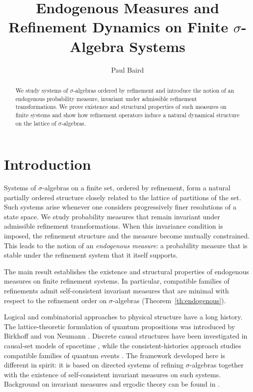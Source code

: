 \documentclass[
 amsmath,amssymb,
  onecolumn %
]{revtex4-2}
\begin{document}
\title{Endogenous Measures and Refinement Dynamics on Finite $\sigma$-Algebra Systems}


\author{Paul Baird}

\begin{abstract}
We study systems of $\sigma$-algebras ordered by refinement and introduce the
notion of an endogenous probability measure, invariant under admissible
refinement transformations. We prove existence and structural properties
of such measures on finite systems and show how refinement
operators induce a natural dynamical structure on the lattice of
$\sigma$-algebras.
\end{abstract}



\maketitle


\section{Introduction}\label{sec1}

Systems of $\sigma$-algebras on a finite set, ordered by refinement,
form a natural partially ordered structure closely related to the
lattice of partitions of the set. Such systems arise whenever one
considers progressively finer resolutions of a state space.
We study probability measures that remain invariant under admissible
refinement transformations. When this invariance condition is imposed,
the refinement structure and the measure become mutually constrained.
This leads to the notion of an \emph{endogenous measure}: a probability
measure that is stable under the refinement system that it itself
supports.

The main result establishes the existence and structural properties
of endogenous measures on finite refinement systems. In particular,
compatible families of refinements admit self-consistent invariant
measures that are minimal with respect to the refinement order on
$\sigma$-algebras (Theorem~\ref{th:endogenous}).

Logical and combinatorial approaches to physical structure have a long
history. The lattice-theoretic formulation of quantum propositions was
introduced by Birkhoff and von Neumann \cite{BvN}. Discrete causal
structures have been investigated in causal-set models of spacetime
\cite{BLS}, while the consistent-histories approach studies compatible
families of quantum events \cite{Gr}. The framework developed here is
different in spirit: it is based on directed systems of refining
$\sigma$-algebras together with the existence of self-consistent
invariant measures on such systems. Background on invariant measures
and ergodic theory can be found in \cite{Pe}.
\end{document}
